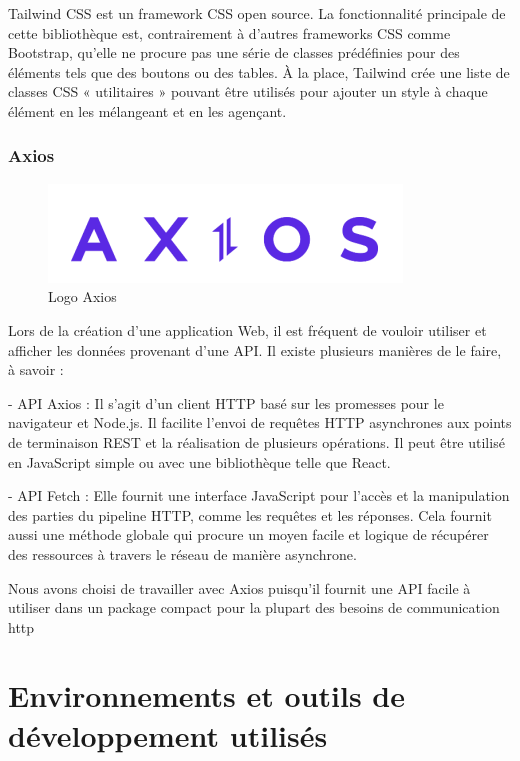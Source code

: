 Tailwind CSS est un framework CSS open source. La fonctionnalité principale de cette bibliothèque est, contrairement à d'autres frameworks CSS comme Bootstrap, qu'elle ne procure pas une série de classes prédéfinies pour des éléments tels que des boutons ou des tables. À la place, Tailwind crée une liste de classes CSS « utilitaires » pouvant être utilisés pour ajouter un style à chaque élément en les mélangeant et en les agençant.

\subsubsection{Axios}

\begin{figure}[H]
    \centering
    \includegraphics[scale=0.5]{Logos/axios.png}
    \caption{Logo Axios}
\end{figure}

Lors de la création d’une application Web, il est fréquent de vouloir utiliser et afficher les données provenant d’une API. Il existe plusieurs manières de le faire, à savoir :
   
- API Axios : Il s’agit d’un client HTTP basé sur les promesses pour le navigateur et Node.js. Il facilite l'envoi de requêtes HTTP asynchrones aux points de terminaison REST et la réalisation de plusieurs opérations. Il peut être utilisé en JavaScript simple ou avec une bibliothèque telle que React.

- API Fetch : Elle fournit une interface JavaScript pour l'accès et la manipulation des parties du pipeline HTTP, comme les requêtes et les réponses. Cela fournit aussi une méthode globale qui procure un moyen facile et logique de récupérer des ressources à travers le réseau de manière asynchrone.

Nous avons choisi de travailler avec Axios puisqu’il fournit une API facile à utiliser dans un package compact pour la plupart des besoins de communication http 

\section{Environnements et outils de développement utilisés}

